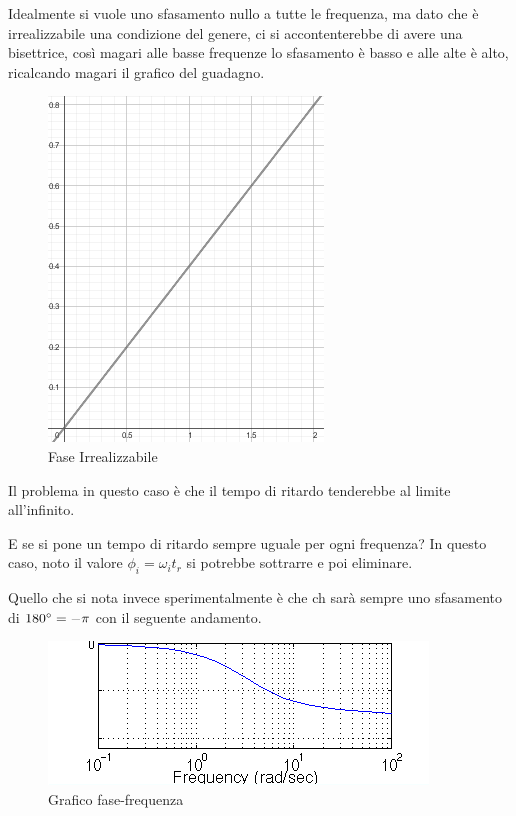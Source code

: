 \documentclass[a4paper, 15pt]{article}
\begin{document}
\begin{adjustwidth}{2in}{}
	Idealmente si vuole uno sfasamento nullo a tutte le frequenza, ma dato che è irrealizzabile una condizione del genere, ci si accontenterebbe  di avere una bisettrice, così magari alle basse frequenze lo sfasamento è basso e alle alte è alto, ricalcando magari il grafico del guadagno.
	\begin{figure}[H]
		\centering
		\includegraphics[width=0.3\linewidth]{fig/guad}
		\caption{Fase Irrealizzabile}
		\label{fig:guad}
	\end{figure}
	Il problema in questo caso è che il tempo di ritardo tenderebbe al limite all'infinito.
	
	E se si pone un tempo di ritardo sempre uguale per ogni frequenza? In questo caso, noto il valore $\phi_i = \omega_i t_r$ si potrebbe sottrarre e poi eliminare. \newline
	
	Quello che si nota invece sperimentalmente è che ch sarà sempre uno sfasamento di $ 180 \degree = - \pi$ con il seguente andamento. 
	
\begin{figure}[H]
	\centering
	\includegraphics[width=0.5\linewidth]{fig/nyquist2}
	\caption{Grafico fase-frequenza}
	\label{fig:nyquist2}
\end{figure}


\end{adjustwidth}
\end{document}
